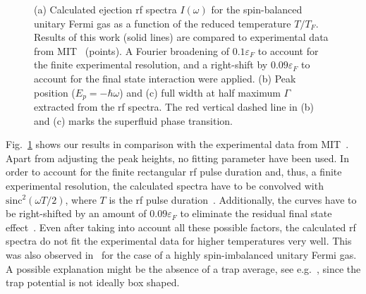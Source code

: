 \begin{figure}[htb]
\begin{minipage}[t]{.49\textwidth}
		\raggedleft
	\end{minipage}
	\caption[Rf spectra of the unitary Fermi gas]{(a) Calculated ejection rf spectra $I(\omega)$ for the spin-balanced unitary Fermi gas as a function of the reduced temperature $T/T_F$. Results of this work (solid lines) are compared to experimental data from MIT~\cite{Mukherjee2019} (points). A Fourier broadening of $0.1\varepsilon_F$ to account for the finite experimental resolution, and a right-shift by $0.09\varepsilon_F$ to account for the final state interaction were applied. (b) Peak position ($E_p=-\hbar\omega$) and (c) full width at half maximum $\Gamma$ extracted from the rf spectra. The red vertical dashed line in (b) and (c) marks the superfluid phase transition.}
	\label{fig:rf-spectra}
\end{figure}

Fig.~\ref{fig:rf-spectra} shows our results in comparison with the experimental data from MIT~\cite{Mukherjee2019}. Apart from adjusting the peak heights, no fitting parameter have been used. In order to account for the finite rectangular rf pulse duration and, thus, a finite experimental resolution, the calculated spectra have to be convolved with $\mathrm{sinc}^2(\omega T/2)$, where $T$ is the rf pulse duration~\cite{Haussmann2009}. Additionally, the curves have to be right-shifted by an amount of $0.09\varepsilon_F$ to eliminate the residual final state effect~\cite{Hu2022}. Even after taking into account all these possible factors, the calculated rf spectra do not fit the experimental data for higher temperatures very well. This was also observed in~\cite{Hu2022} for the case of a highly spin-imbalanced unitary Fermi gas. A possible explanation might be the absence of a trap average, see e.g.~\cite{Schmidt2012}, since the trap potential is not ideally box shaped.


